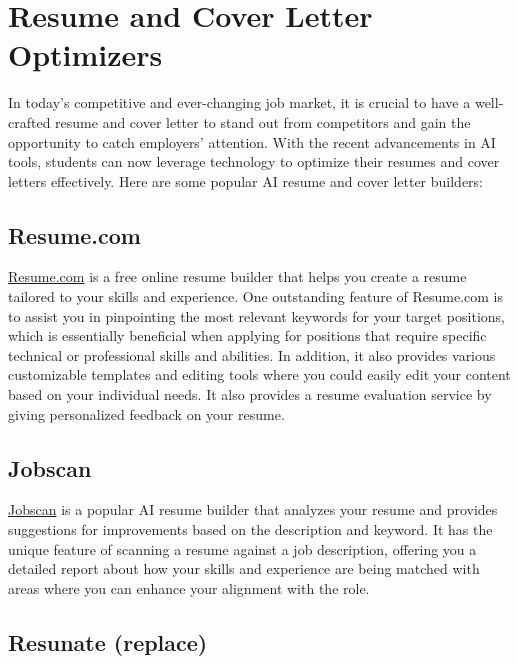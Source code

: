 \documentclass[
]{book}
\begin{document}
\hypertarget{resume-and-cover-letter-optimizers}{%
\chapter{Resume and Cover Letter Optimizers}\label{resume-and-cover-letter-optimizers}}

In today's competitive and ever-changing job market, it is crucial to have a well-crafted resume and cover letter to stand out from competitors and gain the opportunity to catch employers' attention. With the recent advancements in AI tools, students can now leverage technology to optimize their resumes and cover letters effectively. Here are some popular AI resume and cover letter builders:

\hypertarget{resume.com}{%
\section{Resume.com}\label{resume.com}}

\href{https://www.resume.com/}{Resume.com} is a free online resume builder that helps you create a resume tailored to your skills and experience. One outstanding feature of Resume.com is to assist you in pinpointing the most relevant keywords for your target positions, which is essentially beneficial when applying for positions that require specific technical or professional skills and abilities. In addition, it also provides various customizable templates and editing tools where you could easily edit your content based on your individual needs. It also provides a resume evaluation service by giving personalized feedback on your resume.

\hypertarget{jobscan}{%
\section{Jobscan}\label{jobscan}}

\href{https://www.jobscan.co/}{Jobscan} is a popular AI resume builder that analyzes your resume and provides suggestions for improvements based on the description and keyword. It has the unique feature of scanning a resume against a job description, offering you a detailed report about how your skills and experience are being matched with areas where you can enhance your alignment with the role.

\hypertarget{resunate-replace}{%
\section{Resunate (replace)}\label{resunate-replace}}
\end{document}
